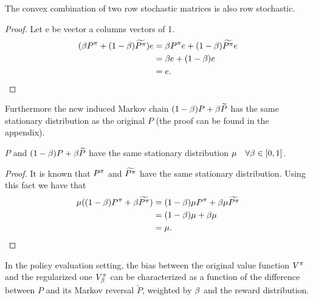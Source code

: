 \begin{lemma}
\label{lem:stochastic_matrix_convex_combination}
The convex combination of two row stochastic matrices is also row stochastic.
\end{lemma}
\begin{proof}
Let e be vector a columns vectors of 1.
\begin{equation}
\begin{split}
       (\beta P^{\pi} + (1-\beta) \widetilde{P^{\pi}})e &= \beta P^{\pi}e +  (1-\beta) \widetilde{P^{\pi}}e \\
       &= \beta e + (1-\beta) e\\
       &= e.
\end{split}
\end{equation}
\end{proof}
Furthermore the new induced Markov chain $(1-\beta) P + \beta \widetilde{P}$ has the same stationary distribution as the original $P$ (the proof can be found in the appendix).

\begin{lemma}
\label{cor:same_stationary_dist}
$P$ and $(1-\beta) P + \beta \widetilde{P}$ have the same stationary distribution $\mu \quad \forall \beta \in [0,1]$.
\end{lemma}
\begin{proof}
It is known that $P^{\pi}$ and $\widetilde{P^{\pi}}$ have the same stationary distribution. Using this fact we have that
\begin{equation}
    \begin{split}
        \mu( (1-\beta) P^{\pi} + \beta \widetilde{P^{\pi}}) &=  (1-\beta) \mu P^{\pi} + \beta \mu \widetilde{P^{\pi}} \\
        &= (1-\beta)\mu + \beta \mu\\
        &= \mu.
    \end{split}
\end{equation}
\end{proof} 

In the policy evaluation setting, the bias between the original value function $V^{\pi}$ and the regularized one $V^{\pi}_{\beta}$ can be characterized as a function of the difference between $P$ and its Markov reversal $\widetilde{P}$, weighted by $\beta$ and the reward distribution.



